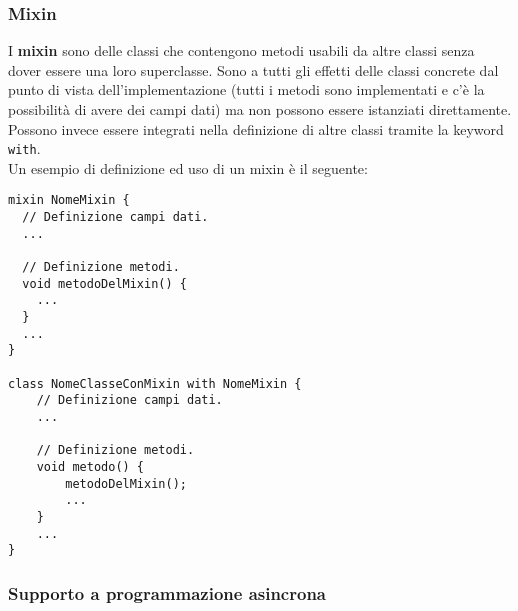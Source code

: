 \subsubsection{Mixin}
\label{subsubsec:mixin}

I \textbf{mixin} sono delle classi che contengono metodi usabili da altre classi senza dover essere una loro superclasse. Sono a tutti gli effetti delle classi concrete dal punto di vista dell'implementazione (tutti i metodi sono implementati e c'è la possibilità di avere dei campi dati) ma non possono essere istanziati direttamente. Possono invece essere integrati nella definizione di altre classi tramite la keyword \texttt{with}.\\
Un esempio di definizione ed uso di un mixin è il seguente:
\begin{lstlisting}
mixin NomeMixin {
  // Definizione campi dati.
  ...

  // Definizione metodi.
  void metodoDelMixin() {
    ...
  }
  ...
}

class NomeClasseConMixin with NomeMixin {
    // Definizione campi dati.
    ...

    // Definizione metodi.
    void metodo() {
        metodoDelMixin();
        ...
    }
    ...
}
\end{lstlisting}

\subsubsection{Supporto a programmazione asincrona}
\label{subsubsec:supporto-programmazione-asincrona}


